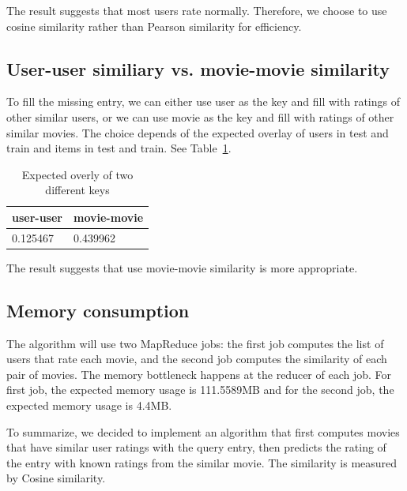 The result suggests that most users rate normally. Therefore, we
choose to use cosine similarity rather than Pearson similarity for
efficiency.

\subsection*{User-user similiary vs. movie-movie similarity}
To fill the missing entry, we can either use user as the key and fill with
ratings of other similar users, or we can use movie as the key and
fill with ratings of other similar movies. The choice depends of the
expected overlay of users in test and train and items in test and
train. See Table~\ref{tab:overlay}.

\begin{table}[!ht]
  \centering
  \begin{tabular}{|p{5cm}|p{5cm}|}
    \hline
    user-user & movie-movie\\
    \hline
    0.125467 & 0.439962\\
    \hline
  \end{tabular}
  \caption{Expected overly of two different keys}
  \label{tab:overlay}
\end{table}

The result suggests that use movie-movie similarity is more
appropriate.

\subsection*{Memory consumption}
The algorithm will use two MapReduce jobs: the first job computes
the list of users that rate each movie, and the second job computes
the similarity of each pair of movies. The memory bottleneck happens
at the reducer of each job. For first job, the expected memory usage
is 111.5589MB and for the second job, the expected memory usage is 4.4MB.

To summarize, we decided to implement an algorithm that first computes
movies that have similar user ratings with the query entry, then
predicts the rating of the entry with known ratings from the similar
movie. The similarity is measured by Cosine similarity.

